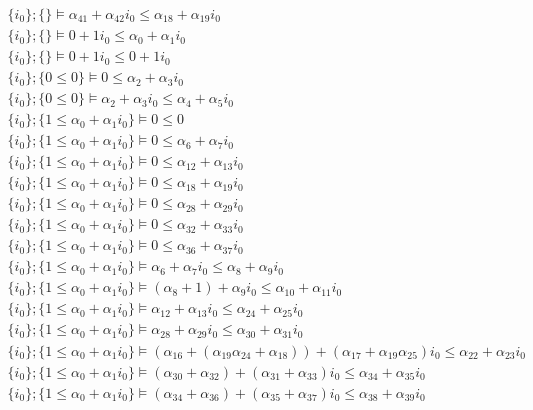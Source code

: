 {\begin{align*}
\{i_{0}\};\{\}  \vDash \alpha_{41} + \alpha_{42}i_{0} \leq \alpha_{18} + \alpha_{19}i_{0}\\ \{i_{0}\};\{\}  \vDash 0 + 1i_{0} \leq \alpha_{0} + \alpha_{1}i_{0}\\ \{i_{0}\};\{\}  \vDash 0 + 1i_{0} \leq 0 + 1i_{0}\\ \{i_{0}\};\{0 \leq 0\}  \vDash 0 \leq \alpha_{2} + \alpha_{3}i_{0}\\ \{i_{0}\};\{0 \leq 0\}  \vDash \alpha_{2} + \alpha_{3}i_{0} \leq \alpha_{4} + \alpha_{5}i_{0}\\ \{i_{0}\};\{1 \leq \alpha_{0} + \alpha_{1}i_{0}\}  \vDash 0 \leq 0\\ \{i_{0}\};\{1 \leq \alpha_{0} + \alpha_{1}i_{0}\}  \vDash 0 \leq \alpha_{6} + \alpha_{7}i_{0}\\ \{i_{0}\};\{1 \leq \alpha_{0} + \alpha_{1}i_{0}\}  \vDash 0 \leq \alpha_{12} + \alpha_{13}i_{0}\\ \{i_{0}\};\{1 \leq \alpha_{0} + \alpha_{1}i_{0}\}  \vDash 0 \leq \alpha_{18} + \alpha_{19}i_{0}\\ \{i_{0}\};\{1 \leq \alpha_{0} + \alpha_{1}i_{0}\}  \vDash 0 \leq \alpha_{28} + \alpha_{29}i_{0}\\ \{i_{0}\};\{1 \leq \alpha_{0} + \alpha_{1}i_{0}\}  \vDash 0 \leq \alpha_{32} + \alpha_{33}i_{0}\\ \{i_{0}\};\{1 \leq \alpha_{0} + \alpha_{1}i_{0}\}  \vDash 0 \leq \alpha_{36} + \alpha_{37}i_{0}\\ \{i_{0}\};\{1 \leq \alpha_{0} + \alpha_{1}i_{0}\}  \vDash \alpha_{6} + \alpha_{7}i_{0} \leq \alpha_{8} + \alpha_{9}i_{0}\\ \{i_{0}\};\{1 \leq \alpha_{0} + \alpha_{1}i_{0}\}  \vDash (\alpha_{8}+1) + \alpha_{9}i_{0} \leq \alpha_{10} + \alpha_{11}i_{0}\\ \{i_{0}\};\{1 \leq \alpha_{0} + \alpha_{1}i_{0}\}  \vDash \alpha_{12} + \alpha_{13}i_{0} \leq \alpha_{24} + \alpha_{25}i_{0}\\ \{i_{0}\};\{1 \leq \alpha_{0} + \alpha_{1}i_{0}\}  \vDash \alpha_{28} + \alpha_{29}i_{0} \leq \alpha_{30} + \alpha_{31}i_{0}\\ \{i_{0}\};\{1 \leq \alpha_{0} + \alpha_{1}i_{0}\}  \vDash (\alpha_{16}+(\alpha_{19}\alpha_{24}+\alpha_{18})) + (\alpha_{17}+\alpha_{19}\alpha_{25})i_{0} \leq \alpha_{22} + \alpha_{23}i_{0}\\ \{i_{0}\};\{1 \leq \alpha_{0} + \alpha_{1}i_{0}\}  \vDash (\alpha_{30}+\alpha_{32}) + (\alpha_{31}+\alpha_{33})i_{0} \leq \alpha_{34} + \alpha_{35}i_{0}\\ \{i_{0}\};\{1 \leq \alpha_{0} + \alpha_{1}i_{0}\}  \vDash (\alpha_{34}+\alpha_{36}) + (\alpha_{35}+\alpha_{37})i_{0} \leq \alpha_{38} + \alpha_{39}i_{0}
\end{align*}

}

